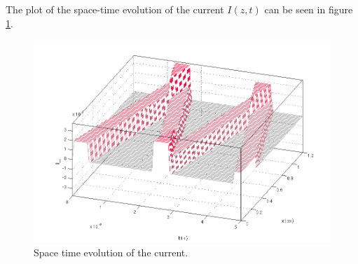 \documentclass[final]{scrreprt} %
\begin{document}
The plot of the space-time evolution of the current $I(z,t)$ can be seen in figure \ref{fig:iplot}. 
\begin{figure}[H]
\centering
\includegraphics[width=\linewidth]{resources/Iplot.png}
\caption{Space time evolution of the current.}
\label{fig:iplot}
\end{figure}
\end{document}
